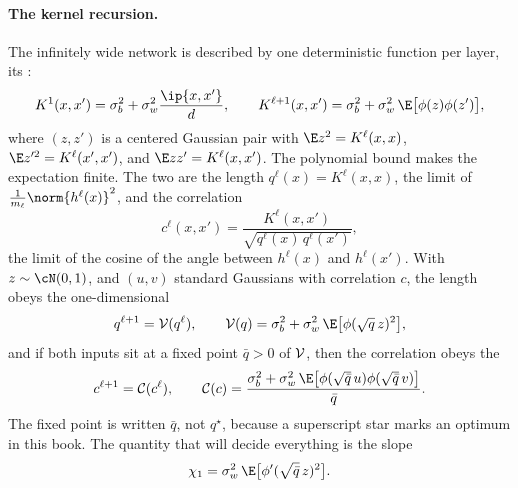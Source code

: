 \begin{refsection}
\paragraph{The kernel recursion.} The infinitely wide network is described by one deterministic function per layer, its :
\begin{equation}\label{eq:signalprop:kernel}
  K^1(x,x')=\sigma_b^2+\sigma_w^2\frac{\ip{x,x'}}d,\qquad K^{\ell+1}(x,x')=\sigma_b^2+\sigma_w^2\,\E\bigl[\phi(z)\phi(z')\bigr],
\end{equation}
where $(z,z')$ is a centered Gaussian pair with $\E z^2=K^\ell(x,x)$, $\E z'^2=K^\ell(x',x')$, and $\E zz'=K^\ell(x,x')$. The polynomial bound makes the expectation finite. The two  are the length $q^\ell(x)=K^\ell(x,x)$, the limit of $\frac1{m_\ell}\norm{h^\ell(x)}^2$, and the correlation
\[
  c^\ell(x,x')=\frac{K^\ell(x,x')}{\sqrt{q^\ell(x)\,q^\ell(x')}},
\]
the limit of the cosine of the angle between $h^\ell(x)$ and $h^\ell(x')$. With $z\sim\cN(0,1)$, and $(u,v)$ standard Gaussians with correlation $c$, the length obeys the one-dimensional 
\begin{equation}\label{eq:signalprop:length}
  q^{\ell+1}=\signalpropV(q^\ell),\qquad \signalpropV(q)=\sigma_b^2+\sigma_w^2\,\E\bigl[\phi(\sqrt q\,z)^2\bigr],
\end{equation}
and if both inputs sit at a fixed point $\bar q>0$ of $\mathcal{V}$, then the correlation obeys the 
\begin{equation}\label{eq:signalprop:cmap}
  c^{\ell+1}=\signalpropC(c^\ell),\qquad \signalpropC(c)=\frac{\sigma_b^2+\sigma_w^2\,\E\bigl[\phi(\sqrt{\bar q}\,u)\phi(\sqrt{\bar q}\,v)\bigr]}{\bar q}.
\end{equation}
The fixed point is written $\bar q$, not $q^\star$, because a superscript star marks an optimum in this book. The quantity that will decide everything is the slope
\begin{equation}\label{eq:signalprop:chi}
  \chi_1=\sigma_w^2\,\E\bigl[\phi'(\sqrt{\bar q}\,z)^2\bigr].
\end{equation}


\end{refsection}
